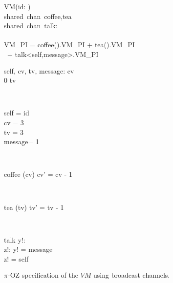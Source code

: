 \begin{figure}[H]
\centering
\begin{class}{VM(id: \integer)}
\ 
\\shared\ chan\ coffee,tea
\ 
\\shared\ chan\ talk:\integer \times \integer
\ \\ \
\\VM\_PI = coffee().VM\_PI + tea().VM\_PI 
\\ \ \qquad \qquad + talk<self,message>.VM\_PI
\\
\begin{state}
self, cv, tv, message: \integer
{} \leq  cv 
\\
0 \leq  tv 
\end{state} 
\\
\begin{init}
self = id
\\cv = 3
\\tv = 3
\\ message= 1
\end{init} 
\\
\begin{op}{coffee}
\Delta (cv)
\ST
cv' = cv - 1
\end{op}
\\
\begin{op}{tea}
\Delta (tv)
\ST
tv' = tv - 1
\end{op}
\\
\begin{op}{talk}
y!: \integer
\\z!: \integer
\ST
y! = message
\\z! = self
\end{op}
\end{class}
\caption{$\pi$-OZ specification of the $VM$ using broadcast channels.}
\label{comp_oz_pi_statefull_vm_broadcast}
\end{figure}